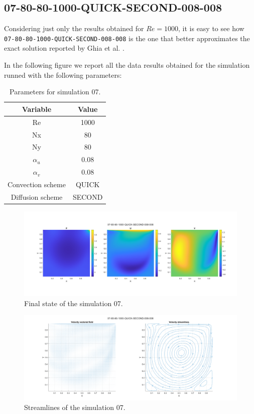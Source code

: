 \subsection{07-80-80-1000-QUICK-SECOND-008-008}
\label{subsec:solution_07}

Considering just only the results obtained for $Re = 1000$, it is easy to see how \texttt{07-80-80-1000-QUICK-SECOND-008-008} is the one that better approximates the exact solution reported by Ghia et al. \cite{Ghia1982HighReSF}.

In the following figure we report all the data results obtained for the simulation runned with the following parameters:

\begin{table}[H]
    \centering
    \begin{tabular}{|c|c|}
        \hline
        \textbf{Variable} & \textbf{Value} \\ \hline
        Re                & 1000           \\
        Nx                & 80             \\
        Ny                & 80             \\
        $\alpha_u$        & 0.08           \\
        $\alpha_v$        & 0.08           \\
        Convection scheme & QUICK          \\
        Diffusion scheme  & SECOND         \\\hline
    \end{tabular}
    \caption{Parameters for simulation 07.}
    \label{tab:parameters_for_comparison}
\end{table}

\begin{figure}[H]
    \centering
    \includegraphics[width=\textwidth]{./img/states/07-80-80-1000-QUICK-SECOND-008-008}
    \caption{Final state of the simulation 07.}
    \label{fig:final_state_07}
\end{figure}

\begin{figure}[H]
    \centering
    \includegraphics[width=\textwidth]{./img/streamline/07-80-80-1000-QUICK-SECOND-008-008}
    \caption{Streamlines of the simulation 07.}
    \label{fig:streamlines_07}
\end{figure}
